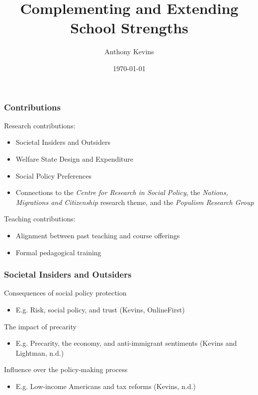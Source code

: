 \documentclass[14pt]{beamer}
\title{Complementing and Extending School Strengths}
\author{Anthony Kevins}
\institute{School of Governance\\
	Utrecht University}
\date{\today}
\begin{document}
\begin{frame}
\titlepage
\end{frame}



\begin{frame}
\frametitle{Contributions}
\pause
Research contributions:
	\begin{itemize}
		\pause
		\item Societal Insiders and Outsiders
		\pause
		\item Welfare State Design and Expenditure
		\pause
		\item Social Policy Preferences
		\pause
		\item Connections to the \textit{Centre for Research in Social Policy}, the \textit{Nations, Migrations and Citizenship} research theme, and the \textit{Populism Research Group}
	\end{itemize}
\bigskip
\pause
Teaching contributions: 
\begin{itemize}
	\pause
	\item Alignment between past teaching and course offerings
	\pause
	\item Formal pedagogical training
\end{itemize}

\end{frame}

\begin{frame}
	\pause
	\frametitle{Societal Insiders and Outsiders}
	Consequences of social policy protection
	\begin{itemize}
		\pause
		\item E.g. Risk, social policy, and trust (Kevins, OnlineFirst)
	\end{itemize}
	\pause
	The impact of precarity
	\begin{itemize}
		\pause
		\item E.g. Precarity, the economy, and anti-immigrant sentiments (Kevins and Lightman, n.d.)
	\end{itemize}
	\pause
	Influence over the policy-making process
	\begin{itemize}
		\pause
		\item E.g. Low-income Americans and tax reforms (Kevins, n.d.)
	\end{itemize}
\end{frame}
\end{document}

